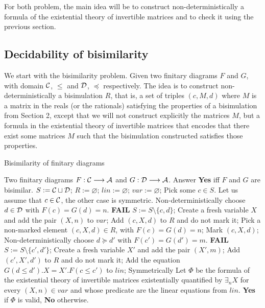 For both problem, the main idea will be to construct non-deterministically a formula of the existential theory of invertible matrices and to check it using the previous section.



\subsection{Decidability of bisimilarity}

We start with the bisimilarity problem. Given two finitary diagrams $F$ and $G$, with domain $\mathcal{C}$, $\leq$ and $\mathcal{D}$, $\preceq$ respectively. The idea is to construct non-deterministically a bisimulation $R$, that is, a set of triples $(c,M,d)$ where $M$ is a matrix in the reals (or the rationals) satisfying the properties of a bisimulation from Section 2, except that we will not construct explicitly the matrices $M$, but a formula in the existential theory of invertible matrices that encodes that there exist some matrices $M$ such that the bisimulation constructed satisfies those properties.

\begin{algorithm}[h!]
\caption{Bisimilarity of finitary diagrams}
\begin{algorithmic}[1]
\Require Two finitary diagrams $F : \mathcal{C} \longrightarrow \mathcal{A}$ and $G : \mathcal{D} \longrightarrow \mathcal{A}$.
\Ensure Answer \textbf{Yes} iff $F$ and $G$ are bisimilar.
\State $S := \mathcal{C}\sqcup\mathcal{D}$;
\State $R := \varnothing$;
\State $lin := \varnothing$;
\State $var := \varnothing$;
	\State Pick some $c \in S$. Let us assume that $c \in \mathcal{C}$, the other case is symmetric.
	\State Non-deterministically choose $d \in \mathcal{D}$ with $F(c) = G(d) = n$. 
		\State\textbf{FAIL}
	\EndIf
	\State $S := S\setminus\{c,d\}$;
	\State Create a fresh variable $X$ and add the pair $(X,n)$ to $var$;
	\State Add $(c,X,d)$ to $R$ and do not mark it;
		\State Pick a non-marked element $(c,X,d) \in R$, with $F(c) = G(d) = n$;
		\State Mark $(c,X,d)$;
			\State Non-deterministically choose $d \succeq d'$ with $F(c') = G(d') = m$.
				\State\textbf{FAIL}
			\EndIf
			\State $S := S\setminus\{c',d'\}$;
			\State Create a fresh variable $X'$ and add the pair $(X',m)$;
			\State Add $(c',X',d')$ to $R$ and do not mark it;
			\State Add the equation $G(d\leq d').X = X'.F(c\leq c')$ to $lin$;
		\EndFor
		\State Symmetrically
		\EndFor
	\EndWhile
\EndWhile
\State Let $\Phi$ be the formula of the existential theory of invertible matrices existentially quantified by $\exists_n X$ for every $(X,n) \in var$ and whose predicate are the linear equations from $lin$.
\State\Return \textbf{Yes} if $\Phi$ is valid, \textbf{No} otherwise.
\end{algorithmic}
\label{alg:algo1}
\end{algorithm}

